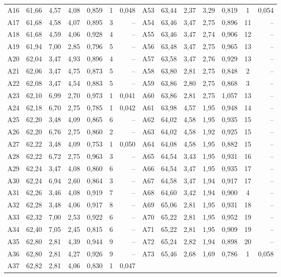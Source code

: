 \begin{tabular}{l r r r r c r @{\hspace{1.2em}} l r r r r c r}
A16 & 61{,}66 & 4{,}57 & 4{,}08 & 0{,}859 & 1 & 0{,}048 & A53 & 63{,}44 & 2{,}37 & 3{,}29 & 0{,}819 & 1 & 0{,}054 \\
A17 & 61{,}68 & 4{,}58 & 4{,}07 & 0{,}895 & 3 & -- & A54 & 63{,}46 & 3{,}47 & 2{,}75 & 0{,}896 & 11 & -- \\
A18 & 61{,}68 & 4{,}59 & 4{,}06 & 0{,}928 & 4 & -- & A55 & 63{,}46 & 3{,}47 & 2{,}74 & 0{,}906 & 12 & -- \\
A19 & 61{,}94 & 7{,}00 & 2{,}85 & 0{,}796 & 5 & -- & A56 & 63{,}48 & 3{,}47 & 2{,}75 & 0{,}965 & 13 & -- \\
A20 & 62{,}04 & 3{,}47 & 4{,}93 & 0{,}896 & 4 & -- & A57 & 63{,}58 & 3{,}47 & 2{,}76 & 0{,}929 & 13 & -- \\
A21 & 62{,}06 & 3{,}47 & 4{,}75 & 0{,}873 & 5 & -- & A58 & 63{,}80 & 2{,}81 & 2{,}75 & 0{,}848 & 2 & -- \\
A22 & 62{,}08 & 3{,}47 & 4{,}54 & 0{,}883 & 5 & -- & A59 & 63{,}86 & 2{,}80 & 2{,}75 & 0{,}868 & 3 & -- \\
A23 & 62{,}10 & 6{,}99 & 2{,}70 & 0{,}973 & 1 & 0{,}041 & A60 & 63{,}86 & 2{,}81 & 2{,}75 & 1{,}057 & 13 & -- \\
A24 & 62{,}18 & 6{,}70 & 2{,}75 & 0{,}785 & 1 & 0{,}042 & A61 & 63{,}98 & 4{,}57 & 1{,}95 & 0{,}948 & 14 & -- \\
A25 & 62{,}20 & 3{,}48 & 4{,}09 & 0{,}865 & 6 & -- & A62 & 64{,}02 & 4{,}58 & 1{,}95 & 0{,}935 & 15 & -- \\
A26 & 62{,}20 & 6{,}76 & 2{,}75 & 0{,}860 & 2 & -- & A63 & 64{,}02 & 4{,}58 & 1{,}92 & 0{,}925 & 15 & -- \\
A27 & 62{,}22 & 3{,}48 & 4{,}09 & 0{,}753 & 1 & 0{,}050 & A64 & 64{,}08 & 4{,}58 & 1{,}95 & 0{,}882 & 15 & -- \\
A28 & 62{,}22 & 6{,}72 & 2{,}75 & 0{,}963 & 3 & -- & A65 & 64{,}54 & 3{,}43 & 1{,}95 & 0{,}931 & 16 & -- \\
A29 & 62{,}24 & 3{,}47 & 4{,}08 & 0{,}860 & 6 & -- & A66 & 64{,}54 & 3{,}47 & 1{,}95 & 0{,}935 & 17 & -- \\
A30 & 62{,}24 & 6{,}94 & 2{,}60 & 0{,}864 & 3 & -- & A67 & 64{,}58 & 3{,}47 & 1{,}94 & 0{,}917 & 17 & -- \\
A31 & 62{,}26 & 3{,}46 & 4{,}08 & 0{,}919 & 7 & -- & A68 & 64{,}60 & 3{,}42 & 1{,}94 & 0{,}900 & 4 & -- \\
A32 & 62{,}28 & 3{,}48 & 4{,}06 & 0{,}917 & 8 & -- & A69 & 65{,}06 & 2{,}81 & 1{,}95 & 0{,}931 & 18 & -- \\
A33 & 62{,}32 & 7{,}00 & 2{,}53 & 0{,}922 & 6 & -- & A70 & 65{,}22 & 2{,}81 & 1{,}95 & 0{,}952 & 19 & -- \\
A34 & 62{,}40 & 7{,}05 & 2{,}45 & 0{,}815 & 6 & -- & A71 & 65{,}22 & 2{,}81 & 1{,}95 & 0{,}909 & 19 & -- \\
A35 & 62{,}80 & 2{,}81 & 4{,}39 & 0{,}944 & 9 & -- & A72 & 65{,}24 & 2{,}82 & 1{,}94 & 0{,}898 & 20 & -- \\
A36 & 62{,}80 & 2{,}81 & 4{,}27 & 0{,}926 & 9 & -- & A73 & 65{,}46 & 2{,}68 & 1{,}69 & 0{,}786 & 1 & 0{,}058 \\
A37 & 62{,}82 & 2{,}81 & 4{,}06 & 0{,}830 & 1 & 0{,}047 &  &  &  &  &  &  &  \\
\bottomrule
\end{tabular}
